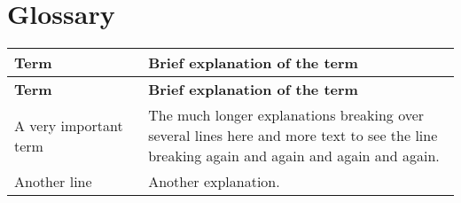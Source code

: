 \documentclass[main]{subfiles}
\begin{document}
\section{Glossary}

\renewcommand{\arraystretch}{1.5}

\begin{longtable}{p{0.3\linewidth} p{0.7\linewidth}}
\hline \textbf{Term} & \textbf{Brief explanation of the term}\\ \hline\hline
\endfirsthead

\hline \textbf{Term} & \textbf{Brief explanation of the term}\\ \hline\hline
\endhead

A very important term & The much longer explanations breaking over several lines here and more text to see the line breaking again and again and again and again.\\
Another line & Another explanation.\\
\end{longtable}
\end{document}
